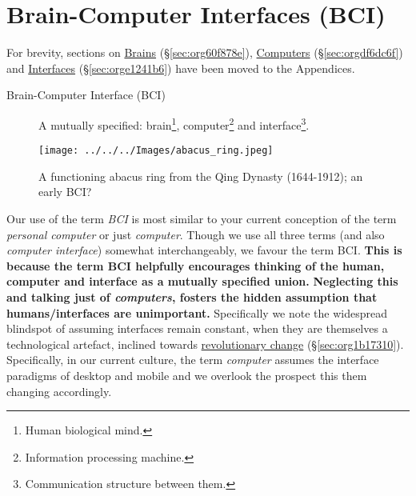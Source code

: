 \documentclass[logo,bsc,singlespacing,parskip]{infthesis}
\begin{document}
\chapter{Brain-Computer Interfaces (BCI)}
\label{sec:orgbedc51e}
For brevity, sections on \hyperref[sec:org60f878e]{Brains} (\S \ref{sec:org60f878e}), \hyperref[sec:orgdf6dc6f]{Computers} (\S \ref{sec:orgdf6dc6f}) and \hyperref[sec:orge1241b6]{Interfaces} (\S \ref{sec:orge1241b6}) have been moved to the Appendices.

\begin{mdframed}
\begin{description}
\item[{\label{orgb0a773e}Brain-Computer Interface (BCI)}] A mutually specified: brain\footnote{Human biological mind.}, computer\footnote{Information processing machine.} and interface\footnote{Communication structure between them.}.
\end{description}
\end{mdframed}

\begin{wrapfigure}{r}{0.55\textwidth}
\centering
\texttt{[image: ../../../Images/abacus\_ring.jpeg]}
\caption[Abacus ring; an early BCI]{A functioning abacus ring from the Qing Dynasty (1644-1912); an early BCI?}
\end{wrapfigure}

Our use of the term \emph{BCI} is most similar to your current conception of the term \emph{personal computer} or just \emph{computer}.
Though we use all three terms (and also \emph{computer interface}) somewhat interchangeably, we favour the term BCI.
\textbf{This is because the term BCI helpfully encourages thinking of the human, computer and interface as a mutually specified union.}
\textbf{Neglecting this and talking just of \emph{computers}, fosters the hidden assumption that humans/interfaces are unimportant.}
Specifically we note the widespread blindspot of assuming interfaces remain constant, when they are themselves a technological artefact, inclined towards \hyperref[sec:org1b17310]{revolutionary change} (\S \ref{sec:org1b17310}).
Specifically, in our current culture, the term \emph{computer} assumes the interface paradigms of desktop and mobile and we overlook the prospect this them changing accordingly.
\end{document}
